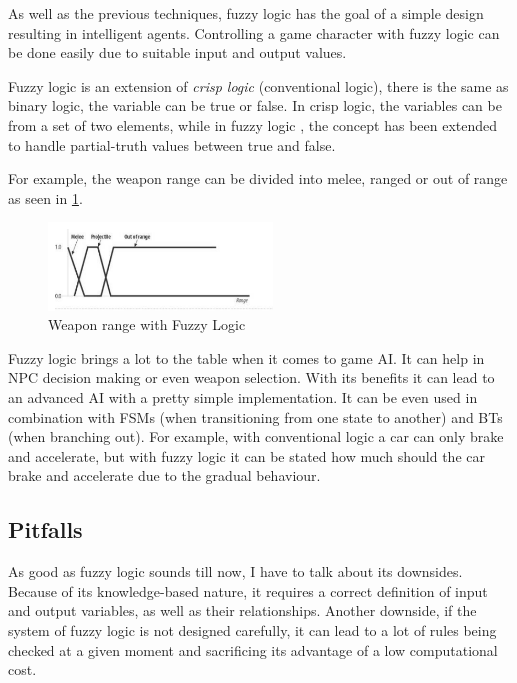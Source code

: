 \documentclass[a4paper, 12pt]{book}
\begin{document}
As well as the previous techniques, fuzzy logic has the goal of a simple design resulting in intelligent agents. Controlling a game character with fuzzy logic can be done easily due to suitable input and output values.

Fuzzy logic is an extension of \emph{crisp logic} (conventional logic), there is the same as binary logic, the variable can be true or false. In crisp logic, the variables can be from a set of two elements, while in fuzzy logic \cite{FuzzyLogicBasedGameSystem}, the concept has been extended to handle partial-truth values between true and false. 

For example, the weapon range can be divided into melee, ranged or out of range as seen in \ref{pic4}.

\begin{figure}[h]
\begin{center}
\includegraphics[width=0.53\textwidth]{Images/weapon_range.png}
\end{center}
\caption{Weapon range with Fuzzy Logic \cite{FuzzyAIGames}}
\label{pic4}
\end{figure}

Fuzzy logic brings a lot to the table when it comes to game AI. It can help in NPC decision making or even weapon selection. With its benefits it can lead to an advanced AI with a pretty simple implementation. It can be even used in combination with FSMs (when transitioning from one state to another) and BTs (when branching out). For example, with conventional logic a car can only brake and accelerate, but with fuzzy logic it can be stated how much should the car brake and accelerate due to the gradual behaviour. 

\subsection{Pitfalls}

As good as fuzzy logic sounds till now, I have to talk about its downsides. Because of its knowledge-based nature, it requires a correct definition of input and output variables, as well as their relationships. Another downside, if the system of fuzzy logic is not designed carefully, it can lead to a lot of rules being checked at a given moment and sacrificing its advantage of a low computational cost.
\end{document}

